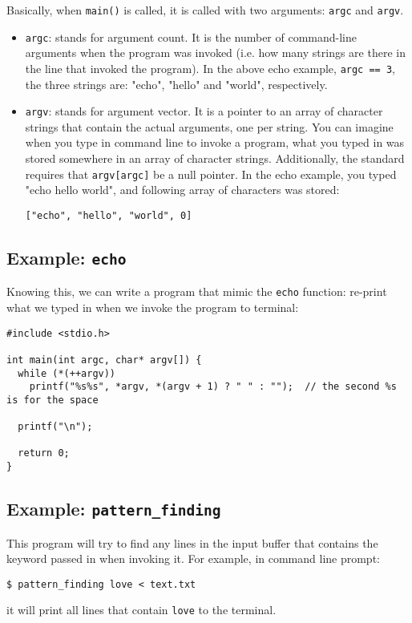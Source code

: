 \documentclass[12pt]{article}
\begin{document}
Basically, when \texttt{main()} is called, it is called with two arguments: \texttt{argc} and \texttt{argv}.
\begin{itemize}
\item \texttt{argc}: stands for argument count. It is the number of command-line arguments when the program was invoked (i.e. how many strings are there in the line that invoked the program). In the above echo example, \texttt{argc == 3}, the three strings are: "echo", "hello" and "world", respectively.
\item \texttt{argv}: stands for argument vector. It is a pointer to an array of character strings that contain the actual arguments, one per string. You can imagine when you type in command line to invoke a program, what you typed in was stored somewhere in an array of character strings. Additionally, the standard requires that \texttt{argv[argc]} be a null pointer. In the echo example, you typed "echo hello world", and following array of characters was stored:
\begin{verbatim}
["echo", "hello", "world", 0]
\end{verbatim}
\end{itemize}

\subsection{Example: \texttt{echo}}
\label{sec:orgfbece89}
Knowing this, we can write a program that mimic the \texttt{echo} function: re-print what we typed in when we invoke the program to terminal:
\begin{verbatim}
#include <stdio.h>

int main(int argc, char* argv[]) {
  while (*(++argv))
    printf("%s%s", *argv, *(argv + 1) ? " " : "");  // the second %s is for the space

  printf("\n");

  return 0;
}
\end{verbatim}

\subsection{Example: \texttt{pattern\_finding}}
\label{sec:orgba86c16}
This program will try to find any lines in the input buffer that contains the keyword passed in when invoking it. For example, in command line prompt:
\begin{verbatim}
$ pattern_finding love < text.txt
\end{verbatim}
it will print all lines that contain \texttt{love} to the terminal.
\end{document}
